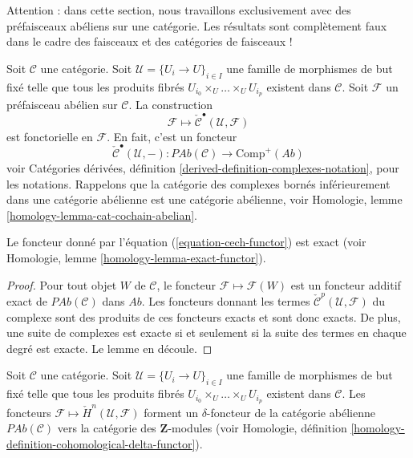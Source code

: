 \noindent
Attention : dans cette section, nous travaillons exclusivement avec des préfaisceaux abéliens
sur une catégorie. Les résultats sont complètement faux dans le
cadre des faisceaux et des catégories de faisceaux !

\medskip\noindent
Soit $\mathcal{C}$ une catégorie. Soit $\mathcal{U} = \{U_i \to U\}_{i \in I}$
une famille de morphismes de but fixé telle que tous les produits fibrés
$U_{i_0} \times_U \ldots \times_U U_{i_p}$ existent dans $\mathcal{C}$.
Soit $\mathcal{F}$ un préfaisceau abélien sur $\mathcal{C}$.
La construction
$$
\mathcal{F} \longmapsto \check{\mathcal{C}}^\bullet(\mathcal{U}, \mathcal{F})
$$
est fonctorielle en $\mathcal{F}$. En fait, c'est un foncteur
\begin{equation}
\label{equation-cech-functor}
\check{\mathcal{C}}^\bullet(\mathcal{U}, -) :
\textit{PAb}(\mathcal{C})
\longrightarrow
\text{Comp}^{+}(\textit{Ab})
\end{equation}
voir
Catégories dérivées, définition \ref{derived-definition-complexes-notation},
pour les notations. Rappelons que la catégorie des complexes bornés inférieurement
dans une catégorie abélienne est une catégorie abélienne, voir
Homologie, lemme \ref{homology-lemma-cat-cochain-abelian}.

\begin{lemma}
\label{lemma-cech-exact-presheaves}
Le foncteur donné par l'équation (\ref{equation-cech-functor})
est exact (voir Homologie, lemme \ref{homology-lemma-exact-functor}).
\end{lemma}

\begin{proof}
Pour tout objet $W$ de $\mathcal{C}$, le foncteur
$\mathcal{F} \mapsto \mathcal{F}(W)$ est un foncteur additif exact
de $\textit{PAb}(\mathcal{C})$ dans $\textit{Ab}$.
Les foncteurs donnant les termes $\check{\mathcal{C}}^p(\mathcal{U}, \mathcal{F})$
du complexe sont des produits de ces foncteurs exacts et sont donc exacts.
De plus, une suite de complexes est exacte si et seulement si la suite
des termes en chaque degré est exacte. Le lemme en découle.
\end{proof}

\begin{lemma}
\label{lemma-cech-cohomology-delta-functor-presheaves}
Soit $\mathcal{C}$ une catégorie.
Soit $\mathcal{U} = \{U_i \to U\}_{i \in I}$ une famille de morphismes
de but fixé telle que tous les produits fibrés
$U_{i_0} \times_U \ldots \times_U U_{i_p}$ existent dans $\mathcal{C}$.
Les foncteurs $\mathcal{F} \mapsto \check{H}^n(\mathcal{U}, \mathcal{F})$
forment un $\delta$-foncteur de la catégorie abélienne $\textit{PAb}(\mathcal{C})$
vers la catégorie des $\mathbf{Z}$-modules (voir
Homologie, définition \ref{homology-definition-cohomological-delta-functor}).
\end{lemma}

